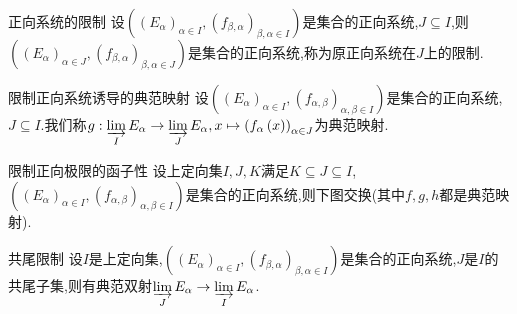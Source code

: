 \begin{definition}{正向系统的限制}{}
	设$\left(\left(E_{\alpha}\right)_{\alpha\in I},\left(f_{\beta,\alpha}\right)_{\beta,\alpha\in I}\right)$是集合的正向系统,$J\subseteq I$,则$\left(\left(E_{\alpha}\right)_{\alpha\in J},\left(f_{\beta,\alpha}\right)_{\beta,\alpha\in J}\right)$是集合的正向系统,称为原正向系统在$J$上的限制.
\end{definition}

\begin{definition}{限制正向系统诱导的典范映射}{}
	设$\left(\left(E_{\alpha}\right)_{\alpha\in I},\left(f_{\alpha,\beta}\right)_{\alpha,\beta\in I}\right)$是集合的正向系统,$J\subseteq I$.我们称$g:\varinjlim \limits_{I}E_{\alpha}\to\varinjlim\limits_{J}E_{\alpha},x\mapsto\left(f_{\alpha}\left(x\right)\right)_{\alpha\in J}$为典范映射.
\end{definition}

\begin{proposition}{限制正向极限的函子性}{}
	设上定向集$I,J,K$满足$K\subseteq J\subseteq I$,$\left(\left(E_{\alpha}\right)_{\alpha\in I},\left(f_{\alpha,\beta}\right)_{\alpha,\beta\in I}\right)$是集合的正向系统,则下图交换(其中$f,g,h$都是典范映射).
	\begin{center}
	\end{center}
\end{proposition}

\begin{proposition}{共尾限制}{}
	设$I$是上定向集,$\left(\left(E_{\alpha}\right)_{\alpha\in I},\left(f_{\beta,\alpha}\right)_{\beta,\alpha\in I}\right)$是集合的正向系统,$J$是$I$的共尾子集,则有典范双射$\varinjlim\limits_{J}E_{\alpha}\to\varinjlim\limits_{I}E_{\alpha}$.
\end{proposition}

